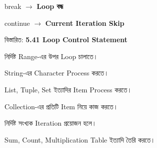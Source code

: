 \begin{rememberbox}

\begin{center}

\textenglish{\ttfamily break}
\(\longrightarrow\)
\textbf{Loop বন্ধ}

\qquad

\textenglish{\ttfamily continue}
\(\longrightarrow\)
\textbf{Current Iteration Skip}

\end{center}

বিস্তারিত:
\textbf{5.41 Loop Control Statement}

\end{rememberbox}



\begin{compacttwocolpoints}

\item নির্দিষ্ট Range-এর উপর Loop চালাতে।

\item String-এর Character Process করতে।

\item List, Tuple, Set ইত্যাদির Item Process করতে।

\item Collection-এর প্রতিটি Item নিয়ে কাজ করতে।

\item নির্দিষ্ট সংখ্যক Iteration প্রয়োজন হলে।

\item Sum, Count, Multiplication Table ইত্যাদি তৈরি করতে।

\end{compacttwocolpoints}



